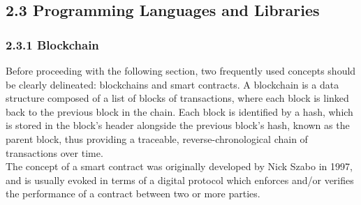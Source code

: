 \documentclass[12pt]{report}
\begin{document}
\subsection{2.3 Programming Languages and
Libraries}\label{programming-languages-and-libraries}

\subsubsection{2.3.1 Blockchain}\label{blockchain}

Before proceeding with the following section, two frequently used
concepts should be clearly delineated: blockchains and smart contracts.
A blockchain is a data structure composed of a list of blocks of
transactions, where each block is linked back to the previous block in
the chain\cite{antonopoulos2014mastering}. Each block is identified by a
hash, which is stored in the block's header alongside the previous
block's hash, known as the parent block\cite{antonopoulos2014mastering}, thus providing a
traceable, reverse-chronological chain of transactions over time.\\
The concept of a smart contract was originally developed by Nick Szabo
in 1997, and is usually evoked in terms of a digital protocol which
enforces and/or verifies the performance of a contract between two or
more
parties\cite{1szabo}.
\end{document}
